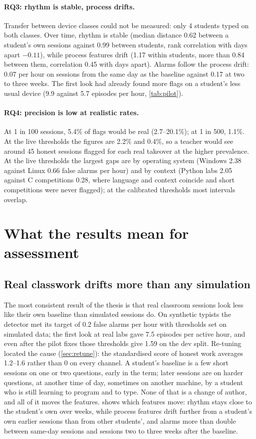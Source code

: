 \paragraph{RQ3: rhythm is stable, process drifts.} Transfer between device
classes could not be measured: only 4 students typed on both classes. Over time,
rhythm is stable (median distance 0.62 between a student's own sessions against
0.99 between students, rank correlation with days apart $-0.11$), while process
features drift (1.17 within students, more than 0.84 between them, correlation
0.45 with days apart). Alarms follow the process drift: 0.07 per hour on
sessions from the same day as the baseline against 0.17 at two to three weeks.
The first look had already found more flags on a student's less usual device
(9.9 against 5.7 episodes per hour, \cref{tab:pilot}).

\paragraph{RQ4: precision is low at realistic rates.} At 1 in 100 sessions,
5.4\% of flags would be real (2.7--20.1\%); at 1 in 500, 1.1\%. At the live
thresholds the figures are 2.2\% and 0.4\%, so a teacher would see around 45
honest sessions flagged for each real takeover at the higher prevalence. At the
live thresholds the largest gaps are by operating system (Windows 2.38 against
Linux 0.66 false alarms per hour) and by context (Python labs 2.05 against C
competitions 0.28, where language and context coincide and short competitions
were never flagged); at the calibrated thresholds most intervals overlap.

\section{What the results mean for assessment}
\label{sec:disc-assessment}

\subsection{Real classwork drifts more than any simulation}
\label{sec:disc-drift}
The most consistent result of the thesis is that real classroom sessions look
less like their own baseline than simulated sessions do. On synthetic typists
the detector met its target of 0.2 false alarms per hour with thresholds set on
simulated data; the first look at real labs gave 7.5 episodes per active hour,
and even after the pilot fixes those thresholds give 1.59 on the dev split. Re-tuning located the cause (\cref{sec:retune}): the
standardised score of honest work averages 1.2--1.6 rather than 0 on every
channel. A student's baseline is a few short sessions on one or two questions,
early in the term; later sessions are on harder questions, at another time of
day, sometimes on another machine, by a student who is still learning to
program and to type. None of that is a change of author, and all of it moves the
features.  shows which features move: rhythm stays close to the student's
own over weeks, while process features drift further from a student's own
earlier sessions than from other students', and alarms more than double between
same-day sessions and sessions two to three weeks after the baseline.

